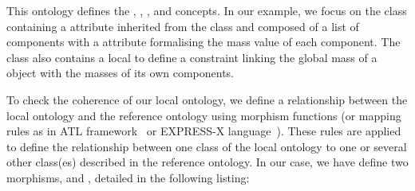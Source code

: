 \begin{isabellebody}
\begin{isamarkuptext}
This ontology defines  the ,
, ,  and  concepts.
In our example, we focus on the  class containing a  attribute
inherited from the  class
and composed of a list of components with a  attribute formalising
the mass value of each component.
The  class also contains a local 
to define a constraint linking the global mass of a  object
with the masses of its own components.
\end{isamarkuptext}\isamarkuptrue%

\begin{isamarkuptext}
To check the coherence of our local ontology, we define a relationship between the local ontology 
and the reference ontology using morphism functions (or mapping rules as in ATL framework~\cite{atl}
or EXPRESS-X language~\cite{BGPP95}). These rules are applied to define the relationship 
between one class of the local ontology to one or several other class(es) described in the reference 
ontology. In our case, we have define two morphisms, 
and , detailed in the following listing: 


\begin{isarbox}


\end{isarbox}
\end{isamarkuptext}
\end{isabellebody}
